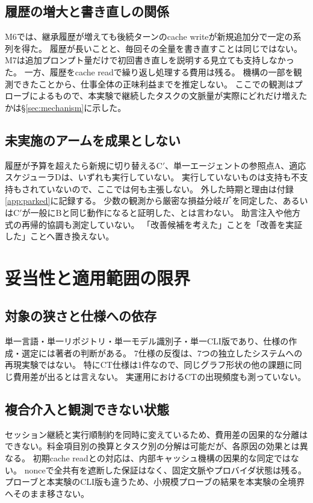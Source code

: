 \documentclass[a4paper,11pt]{article}
\begin{document}
\subsection{履歴の増大と書き直しの関係}
M6では、継承履歴が増えても後続ターンのcache writeが新規追加分で一定の系列を得た。
履歴が長いことと、毎回その全量を書き直すことは同じではない。
M7は追加プロンプト量だけで初回書き直しを説明する見立ても支持しなかった。
一方、履歴をcache readで繰り返し処理する費用は残る。
機構の一部を観測できたことから、仕事全体の正味利益までを推定しない。
ここでの観測はプローブによるもので、本実験で継続したタスクの文脈量が実際にどれだけ増えたかは\S\ref{sec:mechanism}に示した。

\subsection{未実施のアームを成果としない}
履歴が予算を超えたら新規に切り替えるC$'$、単一エージェントの参照点A、適応スケジューラDは、いずれも実行していない。
実行していないものは支持も不支持もされていないので、ここでは何も主張しない。
外した時期と理由は付録\ref{app:parked}に記録する。
少数の観測から厳密な損益分岐$H^*$を同定した、あるいはC$'$が一般にBと同じ動作になると証明した、とは言わない。
助言注入や他方式の再帰的協調も測定していない。
「改善候補を考えた」ことを「改善を実証した」ことへ置き換えない。

\section{妥当性と適用範囲の限界}\label{sec:limits}
\subsection{対象の狭さと仕様への依存}
単一言語・単一リポジトリ・単一モデル識別子・単一CLI版であり、仕様の作成・選定には著者の判断がある。
7仕様の反復は、7つの独立したシステムへの再現実験ではない。
特にCT仕様は1件なので、同じグラフ形状の他の課題に同じ費用差が出るとは言えない。
実運用におけるCTの出現頻度も測っていない。

\subsection{複合介入と観測できない状態}
セッション継続と実行順制約を同時に変えているため、費用差の因果的な分離はできない。料金項目別の換算とタスク別の分解は可能だが、各原因の効果とは異なる。
初期cache readとの対応は、内部キャッシュ機構の因果的な同定ではない。
nonceで全共有を遮断した保証はなく、固定文脈やプロバイダ状態は残る。
プローブと本実験のCLI版も違うため、小規模プローブの結果を本実験の全境界へそのまま移さない。
\end{document}

